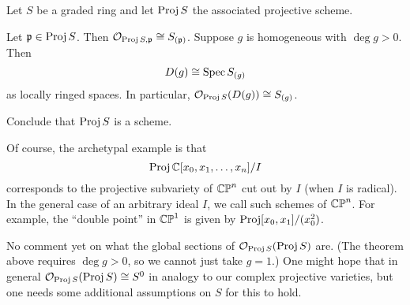 \begin{theorem}
	Let $S$ be a graded ring and let $\operatorname{Proj} S$ the associated projective scheme.
	\begin{enumerate}[(a)]
		\ii Let $\mathfrak p \in \operatorname{Proj} S$.
		Then $\mathcal O_{\operatorname{Proj} S, \mathfrak p} \cong S_{(\mathfrak p)}$.
		\ii Suppose $g$ is homogeneous with $\deg g > 0$. Then
		\[ D(g) \cong \operatorname{Spec} S_{(g)} \]
		as locally ringed spaces.
		In particular, $\mathcal O_{\operatorname{Proj} S}(D(g)) \cong S_{(g)}$.
	\end{enumerate}
\end{theorem}
\begin{ques}
	Conclude that $\operatorname{Proj} S$ is a scheme.
\end{ques}

Of course, the archetypal example is that
\[ \operatorname{Proj} \mathbb C[x_0, x_1, \dots, x_n] / I \]
corresponds to the projective subvariety of $\mathbb{CP}^n$
cut out by $I$ (when $I$ is radical).
In the general case of an arbitrary ideal $I$, we
call such schemes  of $\mathbb{CP}^n$.
For example, the ``double point'' in  $\mathbb{CP}^1$
is given by $\operatorname{Proj}[x_0,x_1]/(x_0^2)$.

\begin{remark}
	No comment yet on what the global sections of $\mathcal O_{\operatorname{Proj} S}(\operatorname{Proj} S)$ are.
	(The theorem above requires $\deg g > 0$, so we cannot just take $g=1$.)
	One might hope that in general $\mathcal O_{\operatorname{Proj} S}(\operatorname{Proj} S) \cong S^0$
	in analogy to our complex projective varieties, but
	one needs some additional assumptions on $S$ for this to hold.
\end{remark}



